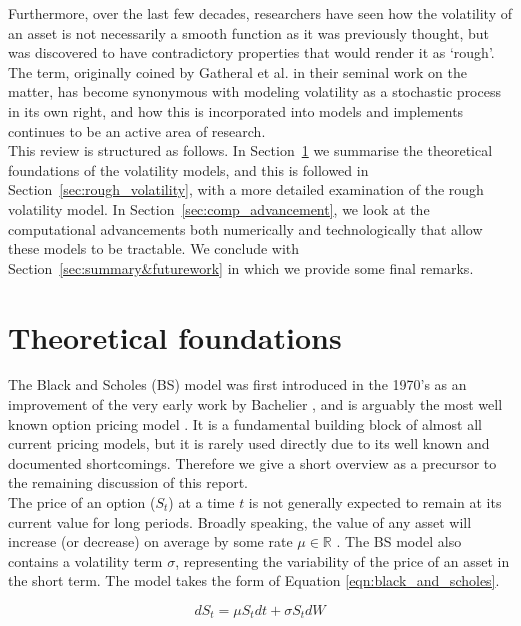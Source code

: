 \documentclass[12pt,oneside]{article}
\begin{document}
Furthermore, over the last few decades, researchers have seen how the volatility of an asset is not necessarily a smooth function as it was previously thought, but was discovered to have contradictory properties that would render it as `rough'. The term, originally coined by Gatheral et al.\cite{Gatheral2014} in their seminal work on the matter,
has become synonymous with modeling volatility as a stochastic process in its own right, and how this is incorporated into models and implements continues to be an active area of research.
\\


This review is structured as follows. In Section~\ref{sec:black_scholes_foundations} we summarise the theoretical foundations of the volatility models, and this is followed in Section~\ref{sec:rough_volatility}, with a more detailed examination of the rough volatility model. In Section~\ref{sec:comp_advancement}, we look at the computational advancements both numerically and technologically that allow these models to be tractable. We conclude with Section~\ref{sec:summary&futurework} in which we provide some final remarks.

\section{Theoretical foundations}
\label{sec:black_scholes_foundations}

The Black and Scholes (BS) model was first introduced in the 1970's as an improvement of the very early work by Bachelier \cite{Bachelier1900}, and is arguably the most well known option pricing model \cite{BlackScholes1973}. It is a fundamental building block of almost all current pricing models, but it is rarely used directly due to its well known and documented shortcomings. Therefore we give a short overview as a precursor to the remaining discussion of this report.
\\

The price of an option ($S_t$) at a time $t$ is not generally expected to remain at its current value for long periods. Broadly speaking, the value of any asset will increase (or decrease) on average by some rate $\mu\in\mathbb{R}$%
. The BS model also contains a volatility term $\sigma$, representing the variability of the price of an asset in the short term. The model takes the form of Equation \ref{eqn:black_and_scholes}.

\begin{equation}
\label{eqn:black_and_scholes} 
dS_t=\mu S_t dt + \sigma S_t dW
\end{equation}
\end{document}
